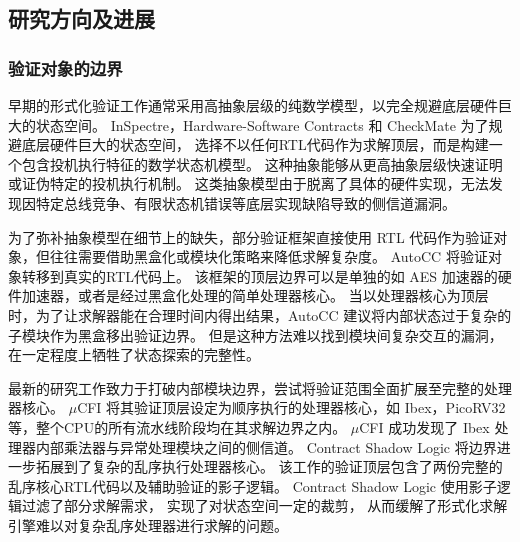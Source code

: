 \subsection{研究方向及进展}

\subsubsection{验证对象的边界}
早期的形式化验证工作通常采用高抽象层级的纯数学模型，以完全规避底层硬件巨大的状态空间。
InSpectre\cite{10.1145/3372297.3417246}，Hardware-Software Contracts\cite{9519500} 和 CheckMate\cite{8574598} 为了规避底层硬件巨大的状态空间，
选择不以任何RTL代码作为求解顶层，而是构建一个包含投机执行特征的数学状态机模型。
这种抽象能够从更高抽象层级快速证明或证伪特定的投机执行机制。
这类抽象模型由于脱离了具体的硬件实现，无法发现因特定总线竞争、有限状态机错误等底层实现缺陷导致的侧信道漏洞。

为了弥补抽象模型在细节上的缺失，部分验证框架直接使用 RTL 代码作为验证对象，但往往需要借助黑盒化或模块化策略来降低求解复杂度。 
AutoCC\cite{10.1145/3613424.3614254} 将验证对象转移到真实的RTL代码上。
该框架的顶层边界可以是单独的如 AES 加速器的硬件加速器，或者是经过黑盒化处理的简单处理器核心。
当以处理器核心为顶层时，为了让求解器能在合理时间内得出结果，AutoCC 建议将内部状态过于复杂的子模块作为黑盒移出验证边界。
但是这种方法难以找到模块间复杂交互的漏洞，在一定程度上牺牲了状态探索的完整性。

最新的研究工作致力于打破内部模块边界，尝试将验证范围全面扩展至完整的处理器核心。
$\mu$CFI\cite{10.1145/3658644.3690344} 将其验证顶层设定为顺序执行的处理器核心，如 Ibex，PicoRV32 等，整个CPU的所有流水线阶段均在其求解边界之内。
$\mu$CFI 成功发现了 Ibex 处理器内部乘法器与异常处理模块之间的侧信道。
Contract Shadow Logic\cite{10.1145/3669940.3707243} 将边界进一步拓展到了复杂的乱序执行处理器核心。
该工作的验证顶层包含了两份完整的乱序核心RTL代码以及辅助验证的影子逻辑。
Contract Shadow Logic 使用影子逻辑过滤了部分求解需求，
实现了对状态空间一定的裁剪，
从而缓解了形式化求解引擎难以对复杂乱序处理器进行求解的问题。



